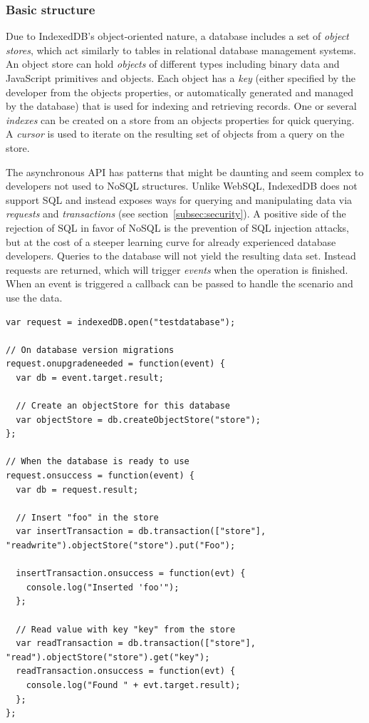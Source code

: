 \subsubsection{Basic structure}
Due to IndexedDB's object-oriented nature, a database includes a set of \emph{object stores}, which act similarly to tables in relational database management systems. An object store can hold \emph{objects} of different types including binary data and JavaScript primitives and objects. Each object has a \emph{key} (either specified by the developer from the objects properties, or automatically generated and managed by the database) that is used for indexing and retrieving records. One or several \emph{indexes} can be created on a store from an objects properties for quick querying. A \emph{cursor} is used to iterate on the resulting set of objects from a query on the store.

The asynchronous API has patterns that might be daunting and seem complex to developers not used to NoSQL structures. Unlike WebSQL, IndexedDB does not support SQL and instead exposes ways for querying and manipulating data via \emph{requests} and \emph{transactions} (see section~\ref{subsec:security}). A positive side of the rejection of SQL in favor of NoSQL is the prevention of SQL injection attacks, but at the cost of a steeper learning curve for already experienced database developers. Queries to the database will not yield the resulting data set. Instead requests are returned, which will trigger \emph{events} when the operation is finished. When an event is triggered a callback can be passed to handle the scenario and use the data.

\begin{Code}
\begin{lstlisting}[caption={Use of IndexedDB}]
var request = indexedDB.open("testdatabase");

// On database version migrations
request.onupgradeneeded = function(event) {
  var db = event.target.result;

  // Create an objectStore for this database
  var objectStore = db.createObjectStore("store");
};

// When the database is ready to use
request.onsuccess = function(event) {
  var db = request.result;

  // Insert "foo" in the store
  var insertTransaction = db.transaction(["store"], "readwrite").objectStore("store").put("Foo");

  insertTransaction.onsuccess = function(evt) {
    console.log("Inserted 'foo'");
  };

  // Read value with key "key" from the store
  var readTransaction = db.transaction(["store"], "read").objectStore("store").get("key");
  readTransaction.onsuccess = function(evt) {
    console.log("Found " + evt.target.result);
  };
};
\end{lstlisting}
\end{Code}

